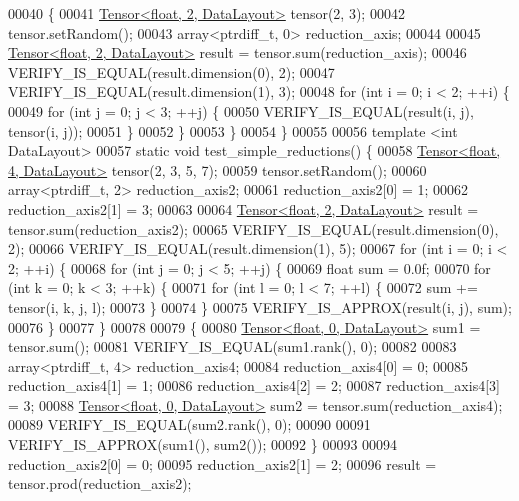 \begin{DoxyCode}
00040   \{
00041     \hyperlink{class_eigen_1_1_tensor}{Tensor<float, 2, DataLayout>} tensor(2, 3);
00042     tensor.setRandom();
00043     array<ptrdiff\_t, 0> reduction\_axis;
00044 
00045     \hyperlink{class_eigen_1_1_tensor}{Tensor<float, 2, DataLayout>} result = tensor.sum(reduction\_axis);
00046     VERIFY\_IS\_EQUAL(result.dimension(0), 2);
00047     VERIFY\_IS\_EQUAL(result.dimension(1), 3);
00048     \textcolor{keywordflow}{for} (\textcolor{keywordtype}{int} i = 0; i < 2; ++i) \{
00049       \textcolor{keywordflow}{for} (\textcolor{keywordtype}{int} j = 0; j < 3; ++j) \{
00050         VERIFY\_IS\_EQUAL(result(i, j), tensor(i, j));
00051       \}
00052     \}
00053   \}
00054 \}
00055 
00056 \textcolor{keyword}{template} <\textcolor{keywordtype}{int} DataLayout>
00057 \textcolor{keyword}{static} \textcolor{keywordtype}{void} test\_simple\_reductions() \{
00058   \hyperlink{class_eigen_1_1_tensor}{Tensor<float, 4, DataLayout>} tensor(2, 3, 5, 7);
00059   tensor.setRandom();
00060   array<ptrdiff\_t, 2> reduction\_axis2;
00061   reduction\_axis2[0] = 1;
00062   reduction\_axis2[1] = 3;
00063 
00064   \hyperlink{class_eigen_1_1_tensor}{Tensor<float, 2, DataLayout>} result = tensor.sum(reduction\_axis2);
00065   VERIFY\_IS\_EQUAL(result.dimension(0), 2);
00066   VERIFY\_IS\_EQUAL(result.dimension(1), 5);
00067   \textcolor{keywordflow}{for} (\textcolor{keywordtype}{int} i = 0; i < 2; ++i) \{
00068     \textcolor{keywordflow}{for} (\textcolor{keywordtype}{int} j = 0; j < 5; ++j) \{
00069       \textcolor{keywordtype}{float} sum = 0.0f;
00070       \textcolor{keywordflow}{for} (\textcolor{keywordtype}{int} k = 0; k < 3; ++k) \{
00071         \textcolor{keywordflow}{for} (\textcolor{keywordtype}{int} l = 0; l < 7; ++l) \{
00072           sum += tensor(i, k, j, l);
00073         \}
00074       \}
00075       VERIFY\_IS\_APPROX(result(i, j), sum);
00076     \}
00077   \}
00078 
00079   \{
00080     \hyperlink{class_eigen_1_1_tensor}{Tensor<float, 0, DataLayout>} sum1 = tensor.sum();
00081     VERIFY\_IS\_EQUAL(sum1.rank(), 0);
00082 
00083     array<ptrdiff\_t, 4> reduction\_axis4;
00084     reduction\_axis4[0] = 0;
00085     reduction\_axis4[1] = 1;
00086     reduction\_axis4[2] = 2;
00087     reduction\_axis4[3] = 3;
00088     \hyperlink{class_eigen_1_1_tensor}{Tensor<float, 0, DataLayout>} sum2 = tensor.sum(reduction\_axis4);
00089     VERIFY\_IS\_EQUAL(sum2.rank(), 0);
00090 
00091     VERIFY\_IS\_APPROX(sum1(), sum2());
00092   \}
00093 
00094   reduction\_axis2[0] = 0;
00095   reduction\_axis2[1] = 2;
00096   result = tensor.prod(reduction\_axis2);

\end{DoxyCode}
